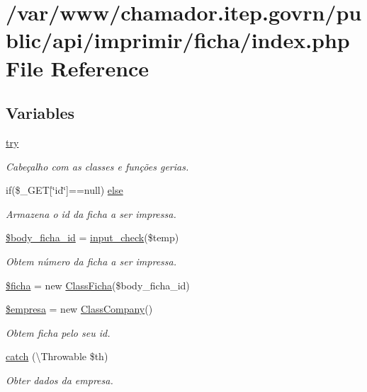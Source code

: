 \hypertarget{imprimir_2ficha_2index_8php}{}\section{/var/www/chamador.itep.\+govrn/public/api/imprimir/ficha/index.php File Reference}
\label{imprimir_2ficha_2index_8php}
\subsection*{Variables}
\begin{DoxyCompactItemize}
\item 
\hyperlink{imprimir_2ficha_2index_8php_abe4cc9788f52e49485473dc699537388}{try}
\begin{DoxyCompactList}\small\item\em Cabeçalho com as classes e funções gerias. \end{DoxyCompactList}\item 
if(\$\+\_\+\+G\+ET\mbox{[}\char`\"{}id\char`\"{}\mbox{]}==null) \hyperlink{imprimir_2ficha_2index_8php_a4b493c640f7b266035c18cd019fdd275}{else}
\begin{DoxyCompactList}\small\item\em Armazena o id da ficha a ser impressa. \end{DoxyCompactList}\item 
\hyperlink{imprimir_2ficha_2index_8php_a7388a2b9be02ae3a1a6e5bc96d972866}{\$body\+\_\+ficha\+\_\+id} = \hyperlink{_header_8php_a8909d20d656fecf83ebaa2bed0cab2c1}{input\+\_\+check}(\$temp)
\begin{DoxyCompactList}\small\item\em Obtem número da ficha a ser impressa. \end{DoxyCompactList}\item 
\hyperlink{imprimir_2ficha_2index_8php_aab83e7ad10d8c95fdbf231d086b83a1f}{\$ficha} = new \hyperlink{class_class_ficha}{Class\+Ficha}(\$body\+\_\+ficha\+\_\+id)
\item 
\hyperlink{imprimir_2ficha_2index_8php_ae4caa8044246171c958ceab2ed5374ee}{\$empresa} = new \hyperlink{class_class_company}{Class\+Company}()
\begin{DoxyCompactList}\small\item\em Obtem ficha pelo seu id. \end{DoxyCompactList}\item 
\hyperlink{imprimir_2ficha_2index_8php_a8104793004944f01dd070fc8b1ade3c4}{catch} (\textbackslash{}Throwable \$th)
\begin{DoxyCompactList}\small\item\em Obter dados da empresa. \end{DoxyCompactList}\end{DoxyCompactItemize}


